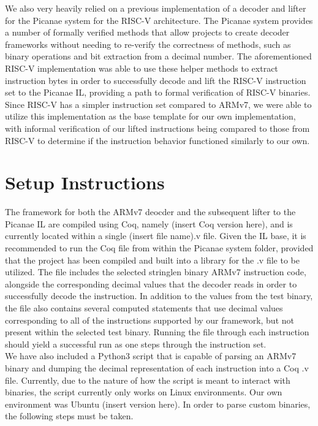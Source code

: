\documentclass[twocolumn]{article}
\begin{document}
We also very heavily relied on a previous implementation of a decoder and lifter for the Picanae system for the RISC-V architecture. The Picanae system provides a number of formally verified methods that allow projects to create decoder frameworks without needing to re-verify the correctness of methods, such as binary operations and bit extraction from a decimal number. The aforementioned RISC-V implementation was able to use these helper methods to extract instruction bytes in order to successfully decode and lift the RISC-V instruction set to the Picanae IL, providing a path to formal verification of RISC-V binaries. Since RISC-V has a simpler instruction set compared to ARMv7, we were able to utilize this implementation as the base template for our own implementation, with informal verification of our lifted instructions being compared to those from RISC-V to determine if the instruction behavior functioned similarly to our own.

\section*{\centering Setup Instructions}
\vspace{0.3cm}

The framework for both the ARMv7 deocder and the subsequent lifter to the Picanae IL are compiled using Coq, namely (insert Coq version here), and is currently located within a single (insert file name).v file. Given the IL base, it is recommended to run the Coq file from within the Picanae system folder, provided that the project has been compiled and built into a library for the .v file to be utilized. The file includes the selected stringlen binary ARMv7 instruction code, alongside the corresponding decimal values that the decoder reads in order to successfully decode the instruction. In addition to the values from the test binary, the file also contains several computed statements that use decimal values corresponding to all of the instructions supported by our framework, but not present within the selected test binary. Running the file through each instruction should yield a successful run as one steps through the instruction set.\\

We have also included a Python3 script that is capable of parsing an ARMv7 binary and dumping the decimal representation of each instruction into a Coq .v file. Currently, due to the nature of how the script is meant to interact with binaries, the script currently only works on Linux environments. Our own environment was Ubuntu (insert version here). In order to parse custom binaries, the following steps must be taken.
\end{document}
